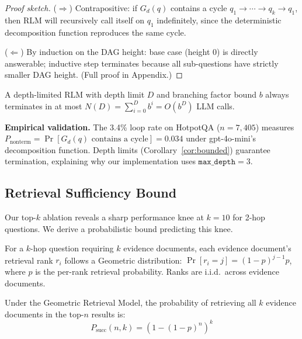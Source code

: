 \begin{proof}[Proof sketch]
($\Rightarrow$) Contrapositive: if $G_d(q)$ contains a cycle $q_1 \to \cdots \to q_k \to q_1$, then RLM will recursively call itself on $q_1$ indefinitely, since the deterministic decomposition function reproduces the same cycle.

($\Leftarrow$) By induction on the DAG height: base case (height 0) is directly answerable; inductive step terminates because all sub-questions have strictly smaller DAG height. (Full proof in Appendix.)
\end{proof}

\begin{corollary}
\label{cor:bounded}
A depth-limited RLM with depth limit $D$ and branching factor bound $b$ always terminates in at most $N(D) = \sum_{i=0}^{D} b^i = O(b^D)$ LLM calls.
\end{corollary}

\textbf{Empirical validation.} The 3.4\% loop rate on HotpotQA ($n=7{,}405$) measures $P_{\text{nonterm}} = \Pr[G_d(q) \text{ contains a cycle}] = 0.034$ under gpt-4o-mini's decomposition function. Depth limits (Corollary~\ref{cor:bounded}) guarantee termination, explaining why our implementation uses $\texttt{max\_depth}=3$.

\subsection{Retrieval Sufficiency Bound}
\label{sec:theory:retrieval}

Our top-$k$ ablation reveals a sharp performance knee at $k=10$ for 2-hop questions. We derive a probabilistic bound predicting this knee.

\begin{definition}
For a $k$-hop question requiring $k$ evidence documents, each evidence document's retrieval rank $r_i$ follows a Geometric distribution: $\Pr[r_i = j] = (1-p)^{j-1} p$, where $p$ is the per-rank retrieval probability. Ranks are i.i.d.\ across evidence documents.
\end{definition}

\begin{theorem}
\label{thm:retrieval}
Under the Geometric Retrieval Model, the probability of retrieving all $k$ evidence documents in the top-$n$ results is:
\begin{equation}
P_{\text{succ}}(n, k) = \left(1 - (1-p)^n\right)^k
\end{equation}
\end{theorem}

